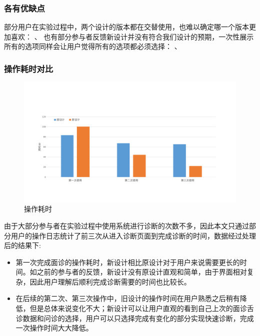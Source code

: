 \subsubsection{各有优缺点}
部分用户在实验过程中，两个设计的版本都在交替使用，也难以确定哪一个版本更加喜欢：
、
也有部分参与者反馈新设计并没有符合我们设计的预期，一次性展示所有的选项同样会让用户觉得所有的选项都必须选择：
、

\subsubsection{操作耗时对比}

\begin{figure}[ht]
    \centering
    \includegraphics[width=13cm]{images/time.pdf}
    \caption{操作耗时}
    \label{fig:ui-time}
\end{figure}

由于大部分参与者在实验过程中使用系统进行诊断的次数不多，因此本文只通过部分用户的操作日志统计了前三次从进入诊断页面到完成诊断的时间，数据经过处理后的结果下:

\begin{itemize}

    \item 第一次完成面诊的操作耗时，新设计相比原设计对于用户来说需要更长的时间。如之前的参与者的反馈，新设计没有原设计直观和简单，由于界面相对复杂，因此用户理解后顺利完成诊断需要的时间也比较长。

    \item 在后续的第二次、第三次操作中，旧设计的操作时间在用户熟悉之后稍有降低，但是总体来说变化不大；新设计可以让用户直观的看到自己上次的面诊舌诊数据和问诊的选择，用户可以只选择完成有变化的部分实现快速诊断，完成一次操作时间大大降低。

\end{itemize}

